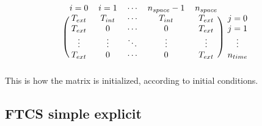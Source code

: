 \documentclass{article}
\begin{document}
            \[
                \begin{blockarray}{cccccc}
                i=0 & i=1 & \cdots & n_{space}-1 & n_{space} \\
                \begin{block}{(ccccc)c}
                  T_{ext} & T_{int} & \cdots & T_{int} & T_{ext} & j=0 \\
                  T_{ext} & 0 & \cdots & 0 & T_{ext} & j=1 \\
                  \vdots & \vdots & \ddots & \vdots & \vdots & \vdots \\
                  T_{ext} & 0 & \cdots & 0 & T_{ext} & n_{time} \\
                \end{block}
                \end{blockarray}
            \]
            This is how the matrix is initialized, according to initial conditions.

    
            \subsection{FTCS simple explicit}
                
\end{document}
